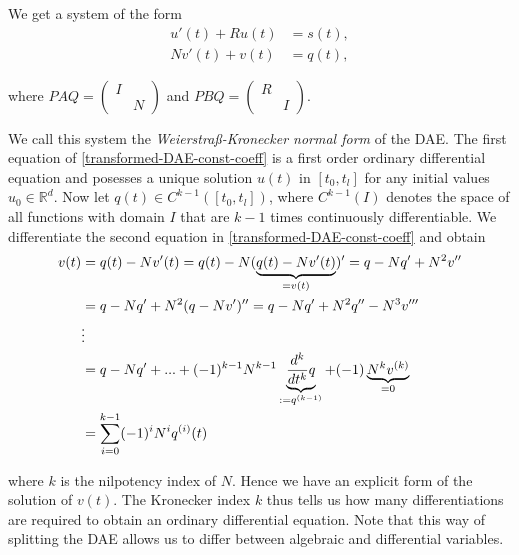 We get a system of the form
\begin{equation}
	\label{transformed-DAE-const-coeff}
	\begin{aligned}
		u'(t) + Ru(t) &= s(t), \\
		Nv'(t) + v(t) &= q(t),
	\end{aligned}
\end{equation}

where $PAQ = 
\left( 
\begin{matrix}
	I & \\
	 & N
\end{matrix} 
\right)$
and $PBQ = 
\left( 
\begin{matrix}
	R & \\
	 & I
\end{matrix} 
\right)$.

We call this system the\emph{ Weierstraß-Kronecker normal form} of the DAE. The first equation of \eqref{transformed-DAE-const-coeff} is a first order ordinary differential equation and posesses a unique solution $u(t)$ in $[t_0,t_l]$ for any initial values $u_0 \in \mathbb{R}^d$. Now let $q(t) \in C^{k-1}([t_0,t_l])$, where $C^{k-1}(I)$ denotes the space of all functions with domain $I$ that are $k-1$ times continuously differentiable. We differentiate the second equation in \eqref{transformed-DAE-const-coeff} and obtain
\begin{align}
	\notag
	v(t) &= q(t) - Nv'(t) = q(t) - N(\underbrace{q(t)-Nv'(t)}_{=v(t)})' = q-Nq'+N^2v'' \\ \notag
	&= q-Nq'+N^2(q-Nv')'' = q-Nq'+N^2q''-N^3v''' \\ \notag
	&\vdots \\ \notag
	&= q-Nq'+...+(-1)^{k-1}N^{k-1}\underbrace{\frac{d^k}{dt^k}q}_{:=q^{(k-1)}}+(-1) \underbrace{N^kv^{(k)}}_{=0}\\ 
	\label{solution-to-transformed-DAE-const-coeff-part2}
	&= \sum_{i=0}^{k-1} (-1)^iN^iq^{(i)}(t)
\end{align}

where $k$ is the nilpotency index of $N$. Hence we have an explicit  form of the solution of $v(t)$. The Kronecker index $k$ thus tells us how many differentiations are required to obtain an ordinary differential equation. Note that this way of splitting the DAE allows us to differ between algebraic and differential variables.

